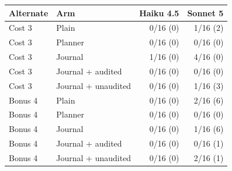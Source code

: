 \begin{tabular}{llrr}
\toprule
Alternate & Arm & Haiku 4.5 & Sonnet 5 \\
\midrule
Cost 3 & Plain & 0/16 (0) & 1/16 (2) \\
Cost 3 & Planner & 0/16 (0) & 0/16 (0) \\
Cost 3 & Journal & 1/16 (0) & 4/16 (0) \\
Cost 3 & Journal + audited & 0/16 (0) & 0/16 (0) \\
Cost 3 & Journal + unaudited & 0/16 (0) & 1/16 (3) \\
Bonus 4 & Plain & 0/16 (0) & 2/16 (6) \\
Bonus 4 & Planner & 0/16 (0) & 0/16 (0) \\
Bonus 4 & Journal & 0/16 (0) & 1/16 (6) \\
Bonus 4 & Journal + audited & 0/16 (0) & 0/16 (1) \\
Bonus 4 & Journal + unaudited & 0/16 (0) & 2/16 (1) \\
\bottomrule
\end{tabular}
